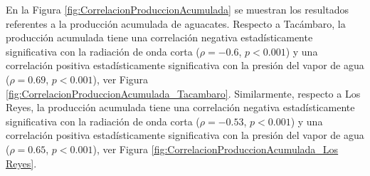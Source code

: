 En la Figura \ref{fig:CorrelacionProduccionAcumulada} se muestran los resultados referentes a la producción acumulada de aguacates. Respecto a Tacámbaro, la producción acumulada tiene una correlación negativa estadísticamente significativa con la radiación de onda corta ($\rho =-0.6$, $p<0.001$) y una correlación positiva estadísticamente significativa con la presión del vapor de agua ($\rho =0.69$, $p<0.001$), ver Figura \ref{fig:CorrelacionProduccionAcumulada_Tacambaro}. Similarmente, respecto a Los Reyes, la producción acumulada tiene una correlación negativa estadísticamente significativa con la radiación de onda corta ($\rho =-0.53$, $p<0.001$) y una correlación positiva estadísticamente significativa con la presión del vapor de agua ($\rho =0.65$, $p<0.001$), ver Figura \ref{fig:CorrelacionProduccionAcumulada_Los Reyes}.\\

